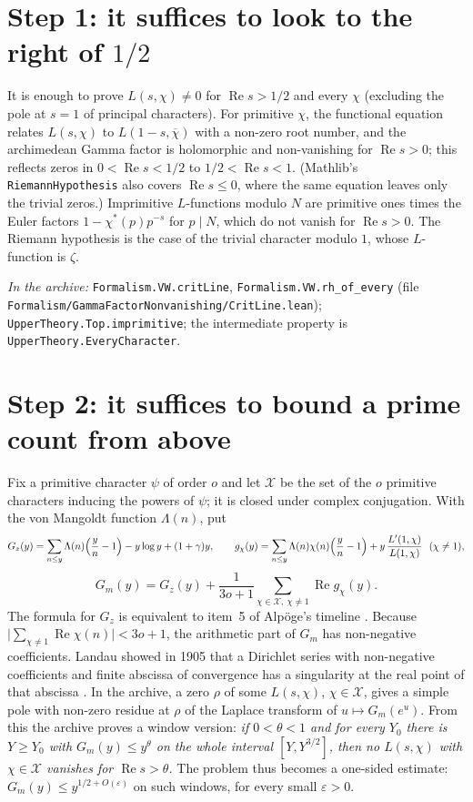 \documentclass[11pt]{article}
\newcommand{\Lean}[1]{\texttt{\small #1}}
\newcommand{\inarch}[1]{\par{\small\raggedright\noindent\emph{In the archive:} #1\par}}
\renewcommand{\Re}{\operatorname{Re}}
\begin{document}
\section{Step 1: it suffices to look to the right of $1/2$}\label{sec:s1}
It is enough to prove $L(s,\chi)\neq0$ for $\Re s>1/2$ and every $\chi$ (excluding the pole at $s=1$ of principal characters). For primitive $\chi$, the functional equation relates $L(s,\chi)$ to $L(1-s,\overline\chi)$ with a non-zero root number, and the archimedean Gamma factor is holomorphic and non-vanishing for $\Re s>0$; this reflects zeros in $0<\Re s<1/2$ to $1/2<\Re s<1$. (Mathlib's \Lean{RiemannHypothesis} also covers $\Re s\le0$, where the same equation leaves only the trivial zeros.) Imprimitive $L$-functions modulo $N$ are primitive ones times the Euler factors $1-\chi^*(p)p^{-s}$ for $p\mid N$, which do not vanish for $\Re s>0$. The Riemann hypothesis is the case of the trivial character modulo $1$, whose $L$-function is $\zeta$.

\inarch{\Lean{Formalism.VW.critLine}, \Lean{Formalism.VW.rh\_of\_every} (file \Lean{Formalism/GammaFactorNonvanishing/CritLine.lean}); \Lean{UpperTheory.Top.imprimitive}; the intermediate property is \Lean{UpperTheory.EveryCharacter}.}

\section{Step 2: it suffices to bound a prime count from above}\label{sec:s2}
Fix a primitive character $\psi$ of order $o$ and let $\mathcal X$ be the set of the $o$ primitive characters inducing the powers of $\psi$; it is closed under complex conjugation. With the von Mangoldt function $\Lambda(n)$, put
\[
G_z(y)=\sum_{n\le y}\Lambda(n)\Bigl(\frac yn-1\Bigr)-y\log y+(1+\gamma)y,\qquad
g_\chi(y)=\sum_{n\le y}\Lambda(n)\chi(n)\Bigl(\frac yn-1\Bigr)+y\,\frac{L'(1,\chi)}{L(1,\chi)}\ \ (\chi\ne1),
\]
\[
G_m(y)=G_z(y)+\frac1{3o+1}\sum_{\chi\in\mathcal X,\ \chi\ne1}\Re g_\chi(y).
\]
The formula for $G_z$ is equivalent to item~5 of Alp\"oge's timeline \cite{alpoge}. Because $\bigl|\sum_{\chi\ne1}\Re\chi(n)\bigr|<3o+1$, the arithmetic part of $G_m$ has non-negative coefficients. Landau showed in 1905 that a Dirichlet series with non-negative coefficients and finite abscissa of convergence has a singularity at the real point of that abscissa \cite{landau}. In the archive, a zero $\rho$ of some $L(s,\chi)$, $\chi\in\mathcal X$, gives a simple pole with non-zero residue at $\rho$ of the Laplace transform of $u\mapsto G_m(e^u)$. From this the archive proves a window version: \emph{if $0<\theta<1$ and for every $Y_0$ there is $Y\ge Y_0$ with $G_m(y)\le y^\theta$ on the whole interval $[Y,Y^{3/2}]$, then no $L(s,\chi)$ with $\chi\in\mathcal X$ vanishes for $\Re s>\theta$.} The problem thus becomes a one-sided estimate: $G_m(y)\le y^{1/2+O(\varepsilon)}$ on such windows, for every small $\varepsilon>0$.
\end{document}
